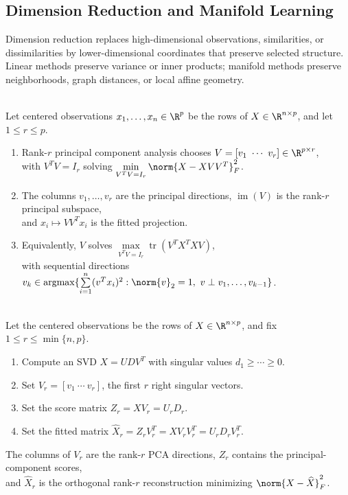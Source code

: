 \subsection{Dimension Reduction and Manifold Learning}

Dimension reduction replaces high-dimensional observations, similarities, or dissimilarities by lower-dimensional coordinates that preserve selected structure.  Linear methods preserve variance or inner products; manifold methods preserve neighborhoods, graph distances, or local affine geometry.

\begin{definition} \label{def:sl-principal-component-analysis} \\
Let centered observations $x_1,\ldots,x_n\in\R^p$ be the rows of $X\in\R^{n\times p}$, and let $1\leq r\leq p$.
\begin{enumerate}[label=(\roman*)]
\setlength{\itemsep}{0pt}
\item Rank-$r$ principal component analysis chooses $V=[v_1\ \cdots\ v_r]\in\R^{p\times r}$,\\
with $V^TV=I_r$ solving $\min\limits_{V^TV=I_r}\norm{X-XVV^T}_F^2$.
\item The columns $v_1,\ldots,v_r$ are the principal directions, $\operatorname{im}(V)$ is the rank-$r$ principal subspace,\\
and $x_i\mapsto VV^Tx_i$ is the fitted projection.
\item Equivalently, $V$ solves $\max\limits_{V^TV=I_r}\operatorname{tr}(V^TX^TXV)$,\\
with sequential directions $v_k\in\operatorname*{argmax}\limits\{\sum\limits_{i=1}^n(v^Tx_i)^2:\norm{v}_2=1,\ v\perp v_1,\ldots,v_{k-1}\}$.
\end{enumerate}
\end{definition}

\begin{method} \label{meth:sl-pca-by-svd} \\
Let the centered observations be the rows of $X\in\R^{n\times p}$, and fix $1\leq r\leq \min\{n,p\}$.
\begin{enumerate}[label=(\roman*)]
\setlength{\itemsep}{0pt}
\item Compute an SVD $X=UDV^T$ with singular values $d_1\geq\cdots\geq 0$.
\item Set $V_r=[v_1\ \cdots\ v_r]$, the first $r$ right singular vectors.
\item Set the score matrix $Z_r=XV_r=U_rD_r$.
\item Set the fitted matrix $\widehat{X}_r=Z_rV_r^T=XV_rV_r^T=U_rD_rV_r^T$.
\end{enumerate}
The columns of $V_r$ are the rank-$r$ PCA directions, $Z_r$ contains the principal-component scores,\\
and $\widehat{X}_r$ is the orthogonal rank-$r$ reconstruction minimizing $\norm{X-\widehat{X}}_F^2$.
\end{method}

